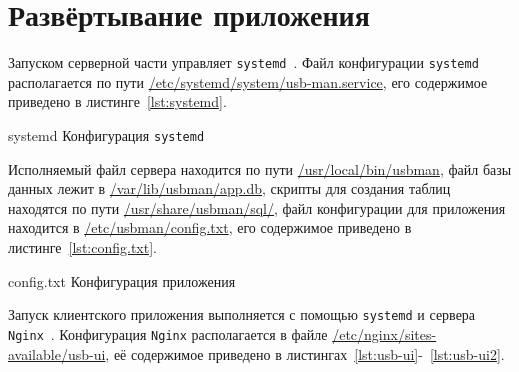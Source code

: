 %
%
%
%
%
%
%
%
%
%
%
%
%
%
%
%

\section{Развёртывание приложения}

Запуском серверной части управляет \texttt{systemd}~\cite{Systemd}. Файл конфигурации \texttt{systemd} располагается
по пути \url{/etc/systemd/system/usb-man.service}, его содержимое приведено в листинге~\ref{lst:systemd}. 

\clearpage

    {systemd}
    {Конфигурация \texttt{systemd}}

Исполняемый файл сервера находится по пути \url{/usr/local/bin/usbman}, файл базы данных лежит в 
\url{/var/lib/usbman/app.db}, скрипты для создания таблиц находятся по пути \url{/usr/share/usbman/sql/},
файл конфигурации для приложения находится в \url{/etc/usbman/config.txt}, его содержимое приведено 
в листинге~\ref{lst:config.txt}.

    {config.txt}
    {Конфигурация приложения}

Запуск клиентского приложения выполняется с помощью \texttt{systemd} и сервера \texttt{Nginx}~\cite{Nginx}.
Конфигурация \texttt{Nginx} располагается в файле \url{/etc/nginx/sites-available/usb-ui}, её содержимое приведено
в листингах~\ref{lst:usb-ui}-~\ref{lst:usb-ui2}.

